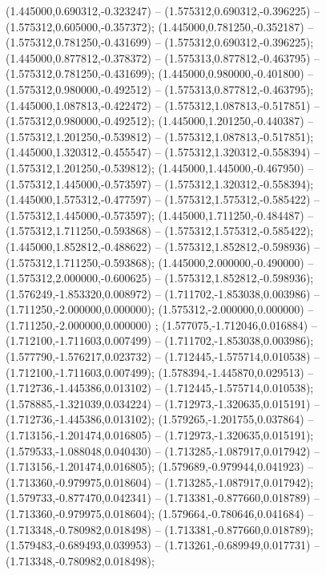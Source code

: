  (1.445000,0.690312,-0.323247) -- (1.575312,0.690312,-0.396225) -- (1.575312,0.605000,-0.357372);
 (1.445000,0.781250,-0.352187) -- (1.575312,0.781250,-0.431699) -- (1.575312,0.690312,-0.396225);
 (1.445000,0.877812,-0.378372) -- (1.575313,0.877812,-0.463795) -- (1.575312,0.781250,-0.431699);
 (1.445000,0.980000,-0.401800) -- (1.575312,0.980000,-0.492512) -- (1.575313,0.877812,-0.463795);
 (1.445000,1.087813,-0.422472) -- (1.575312,1.087813,-0.517851) -- (1.575312,0.980000,-0.492512);
 (1.445000,1.201250,-0.440387) -- (1.575312,1.201250,-0.539812) -- (1.575312,1.087813,-0.517851);
 (1.445000,1.320312,-0.455547) -- (1.575312,1.320312,-0.558394) -- (1.575312,1.201250,-0.539812);
 (1.445000,1.445000,-0.467950) -- (1.575312,1.445000,-0.573597) -- (1.575312,1.320312,-0.558394);
 (1.445000,1.575312,-0.477597) -- (1.575312,1.575312,-0.585422) -- (1.575312,1.445000,-0.573597);
 (1.445000,1.711250,-0.484487) -- (1.575312,1.711250,-0.593868) -- (1.575312,1.575312,-0.585422);
 (1.445000,1.852812,-0.488622) -- (1.575312,1.852812,-0.598936) -- (1.575312,1.711250,-0.593868);
 (1.445000,2.000000,-0.490000) -- (1.575312,2.000000,-0.600625) -- (1.575312,1.852812,-0.598936);
 (1.576249,-1.853320,0.008972) -- (1.711702,-1.853038,0.003986) -- (1.711250,-2.000000,0.000000);
 (1.575312,-2.000000,0.000000) -- (1.711250,-2.000000,0.000000) ;
 (1.577075,-1.712046,0.016884) -- (1.712100,-1.711603,0.007499) -- (1.711702,-1.853038,0.003986);
 (1.577790,-1.576217,0.023732) -- (1.712445,-1.575714,0.010538) -- (1.712100,-1.711603,0.007499);
 (1.578394,-1.445870,0.029513) -- (1.712736,-1.445386,0.013102) -- (1.712445,-1.575714,0.010538);
 (1.578885,-1.321039,0.034224) -- (1.712973,-1.320635,0.015191) -- (1.712736,-1.445386,0.013102);
 (1.579265,-1.201755,0.037864) -- (1.713156,-1.201474,0.016805) -- (1.712973,-1.320635,0.015191);
 (1.579533,-1.088048,0.040430) -- (1.713285,-1.087917,0.017942) -- (1.713156,-1.201474,0.016805);
 (1.579689,-0.979944,0.041923) -- (1.713360,-0.979975,0.018604) -- (1.713285,-1.087917,0.017942);
 (1.579733,-0.877470,0.042341) -- (1.713381,-0.877660,0.018789) -- (1.713360,-0.979975,0.018604);
 (1.579664,-0.780646,0.041684) -- (1.713348,-0.780982,0.018498) -- (1.713381,-0.877660,0.018789);
 (1.579483,-0.689493,0.039953) -- (1.713261,-0.689949,0.017731) -- (1.713348,-0.780982,0.018498);
